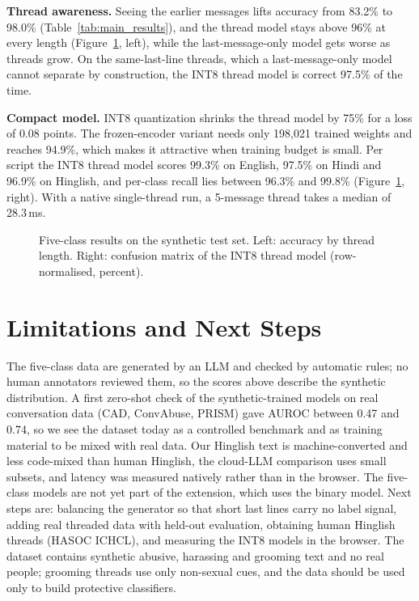 \documentclass[sigconf,9pt]{acmart}
\begin{document}
\par\textbf{Thread awareness.} Seeing the earlier messages lifts accuracy from 83.2\% to 98.0\% (Table~\ref{tab:main_results}), and the thread model stays above 96\% at every length (Figure~\ref{fig:results2}, left), while the last-message-only model gets worse as threads grow. On the same-last-line threads, which a last-message-only model cannot separate by construction, the INT8 thread model is correct 97.5\% of the time.

\par\textbf{Compact model.} INT8 quantization shrinks the thread model by 75\% for a loss of 0.08 points. The frozen-encoder variant needs only 198{,}021 trained weights and reaches 94.9\%, which makes it attractive when training budget is small. Per script the INT8 thread model scores 99.3\% on English, 97.5\% on Hindi and 96.9\% on Hinglish, and per-class recall lies between 96.3\% and 99.8\% (Figure~\ref{fig:results2}, right). With a native single-thread run, a 5-message thread takes a median of 28.3\,ms.

\begin{figure}[!t]
  \centering
  \begin{minipage}[c]{0.56\textwidth}\centering
    \resizebox{\linewidth}{!}{}
  \end{minipage}\hfill
  \begin{minipage}[c]{0.42\textwidth}\centering
    \resizebox{0.9\linewidth}{!}{}
  \end{minipage}
  \caption{Five-class results on the synthetic test set. Left: accuracy by thread length. Right: confusion matrix of the INT8 thread model (row-normalised, percent).}
  \label{fig:results2}
\end{figure}

\section{Limitations and Next Steps}
The five-class data are generated by an LLM and checked by automatic rules; no human annotators reviewed them, so the scores above describe the synthetic distribution. A first zero-shot check of the synthetic-trained models on real conversation data (CAD, ConvAbuse, PRISM) gave AUROC between 0.47 and 0.74, so we see the dataset today as a controlled benchmark and as training material to be mixed with real data. Our Hinglish text is machine-converted and less code-mixed than human Hinglish, the cloud-LLM comparison uses small subsets, and latency was measured natively rather than in the browser. The five-class models are not yet part of the extension, which uses the binary model. Next steps are: balancing the generator so that short last lines carry no label signal, adding real threaded data with held-out evaluation, obtaining human Hinglish threads (HASOC ICHCL), and measuring the INT8 models in the browser. The dataset contains synthetic abusive, harassing and grooming text and no real people; grooming threads use only non-sexual cues, and the data should be used only to build protective classifiers.
\end{document}
